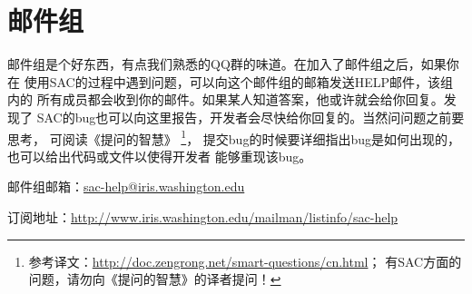 \section{邮件组}
邮件组是个好东西，有点我们熟悉的QQ群的味道。在加入了邮件组之后，如果你在
使用SAC的过程中遇到问题，可以向这个邮件组的邮箱发送HELP邮件，该组内的
所有成员都会收到你的邮件。如果某人知道答案，他或许就会给你回复。发现了
SAC的bug也可以向这里报告，开发者会尽快给你回复的。当然问问题之前要思考，
可阅读《提问的智慧》
\footnote{参考译文：\url{http://doc.zengrong.net/smart-questions/cn.html}；
有SAC方面的问题，请勿向《提问的智慧》的译者提问！}，
提交bug的时候要详细指出bug是如何出现的，也可以给出代码或文件以使得开发者
能够重现该bug。

邮件组邮箱：\url{sac-help@iris.washington.edu}

订阅地址：\small{\url{http://www.iris.washington.edu/mailman/listinfo/sac-help}}
